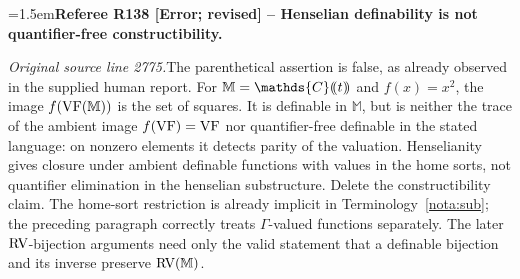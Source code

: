 \documentclass[12pt]{amsart}
\newcommand{\RefereeRemark}[4]{%
  \par\medskip\begingroup\normalfont\small\color{RefereePurple}%
  \emergencystretch=1.5em\noindent\textbf{Referee R#1 [#2] -- #3.}\par\nobreak\noindent #4\par
  \endgroup\medskip
}
\newcommand{\memph}[1]{{\color{magenta}\emph{#1}}}
\theoremstyle{plain}
\theoremstyle{definition}
\newtheorem{defn}[thm]{Definition}
\theoremstyle{remark}
\numberwithin{equation}{section}
\theoremstyle{plain}
\newcommand{\VF}{\textup{VF}}
\newcommand{\RV}{\textup{RV}}
\newcommand{\C}{\mathds{C}}
\newcommand{\gR}{\mathfrak{R}}
\newcommand{\0}{\emptyset}
\newcommand{\dpar}[1]{%
   (\mkern-4mu (#1 )\mkern-4mu )}
\newcommand{\mdl}[1]{\mathcal{#1}}  %
\newcommand{\rest}{\upharpoonright}
\newcommand{\fun}{\longrightarrow}
\newcommand{\sub}{\subseteq}
\newcommand{\mgRV}{{\mu}{\RV}}
\newcommand{\mG}{{\mu}{\Gamma}}
\newcommand{\RES}{\textup{RES}}
\newcommand{\mgRES}{{\mu}{\RES}}
\DeclareMathOperator{\gsk}{\mathbf{K}_+}
\begin{document}
\RefereeRemark{138}{Error; revised}{Henselian definability is not quantifier-free constructibility}{%
\textit{Original source line 2775.}\quad The parenthetical assertion is false, as already observed in the supplied human report. For $\mathbb M=\C\dpar t$ and $f(x)=x^2$, the image $f(\VF(\mathbb M))$ is the set of squares. It is definable in $\mathbb M$, but is neither the trace of the ambient image $f(\VF)=\VF$ nor quantifier-free definable in the stated language: on nonzero elements it detects parity of the valuation. Henselianity gives closure under ambient definable functions with values in the home sorts, not quantifier elimination in the henselian substructure. Delete the constructibility claim. The home-sort restriction is already implicit in Terminology~\ref{nota:sub}; the preceding paragraph correctly treats $\Gamma$-valued functions separately. The later $\RV$-bijection arguments need only the valid statement that a definable bijection and its inverse preserve $\RV(\mathbb M)$.
}


%
%
%
%
%
\end{document}
